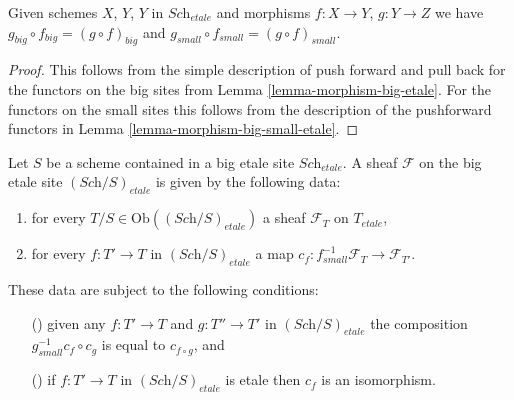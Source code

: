 \begin{lemma}
\label{lemma-composition-etale}
Given schemes $X$, $Y$, $Y$ in $\textit{Sch}_{etale}$
and morphisms $f : X \to Y$, $g : Y \to Z$ we have
$g_{big} \circ f_{big} = (g \circ f)_{big}$ and
$g_{small} \circ f_{small} = (g \circ f)_{small}$.
\end{lemma}

\begin{proof}
This follows from the simple description of push forward
and pull back for the functors on the big sites from
Lemma \ref{lemma-morphism-big-etale}. For the functors
on the small sites this follows from the description of
the pushforward functors in Lemma \ref{lemma-morphism-big-small-etale}.
\end{proof}

\begin{lemma}
\label{lemma-characterize-sheaf-big-etale}
Let $S$ be a scheme contained in a big etale site $\textit{Sch}_{etale}$.
A sheaf $\mathcal{F}$ on the big etale site $(\textit{Sch}/S)_{etale}$
is given by the following data:
\begin{enumerate}
\item for every $T/S \in \text{Ob}((\textit{Sch}/S)_{etale})$ a sheaf
$\mathcal{F}_T$ on $T_{etale}$,
\item for every $f : T' \to T$ in
$(\textit{Sch}/S)_{etale}$ a map
$c_f : f_{small}^{-1}\mathcal{F}_{T} \to \mathcal{F}_{T'}$.
\end{enumerate}
These data are subject to the following conditions:
\begin{enumerate}
\item[(\romannumeral1)] given any $f : T' \to T$ and $g : T'' \to T'$ in
$(\textit{Sch}/S)_{etale}$ the composition $g_{small}^{-1}c_f \circ c_g$
is equal to $c_{f \circ g}$, and
\item[(\romannumeral2)] if $f : T' \to T$ in $(\textit{Sch}/S)_{etale}$ is
etale then $c_f$ is an isomorphism.
\end{enumerate}
\end{lemma}

